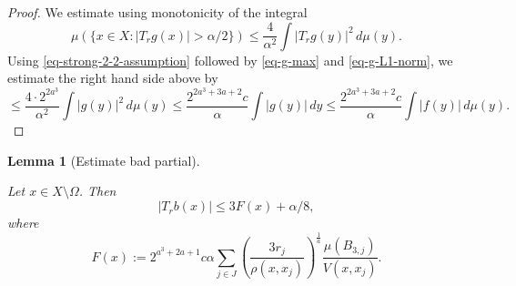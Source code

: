 \documentclass[10pt,a4paper]{article}
\theoremstyle{plain}
\newtheorem{lemma}[theorem]{Lemma}
\theoremstyle{definition}
\numberwithin{equation}{subsection}
\newcommand{\lean}[1]{}
\newcommand{\uses}[1]{}
\newcommand{\leanok}{}
\begin{document}
\begin{proof}
    \leanok
    We estimate using monotonicity of the integral
\begin{equation*}
     \mu\left(\{x\in X: |T_r g(x)|>{\alpha}/2\}\right)\leq \frac{4}{\alpha^2} \int |T_r g(y)|^2\, d\mu(y).
\end{equation*}
Using \eqref{eq-strong-2-2-assumption} followed by \eqref{eq-g-max} and \eqref{eq-g-L1-norm}, we estimate the right hand side above by
\begin{equation}
    \label{eq-Hr-g}
    \leq \frac{4\cdot 2^{2a^3}}{\alpha^2} \int |g(y)|^2\, d\mu(y)\leq \frac{2^{2a^3+3a+2}c}{\alpha} \int |g(y)|\, dy \le \frac{2^{2a^3+3a+2}c}{\alpha} \int |f(y)|\, d\mu(y).
\end{equation}
\end{proof}

\begin{lemma}[Estimate bad partial]
    \label{estimate-bad-partial}
    \leanok
    \lean{estimate_bad_partial}
    \uses{Calderon-Zygmund-decomposition}
    Let $x\in X\setminus\Omega$. Then
    \begin{equation*}
        |T_rb(x)| \le 3F(x)+\alpha/8,
    \end{equation*}
    where
    \begin{equation*}
        F(x) := 2^{a^3+2a+1} c\alpha \sum_{j\in J} \left(\frac{3r_j}{\rho(x,x_j)}\right)^{\frac{1}{a}}\frac{\mu(B_{3,j})}{V(x,x_j)}.
    \end{equation*}
\end{lemma}
\end{document}
